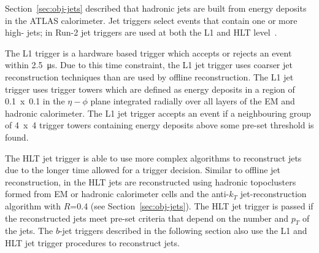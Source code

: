 Section~\ref{sec:obj-jets} described that hadronic jets are built from energy deposits in the ATLAS calorimeter.
Jet triggers select events that contain one or more high-\pT{} jets;
in Run-2 jet triggers are used at both the L1 and HLT level~\cite{trig-L1calo,trig-bTrig_desc}.


The L1 trigger is a hardware based trigger which accepts or rejects an event within \SI{2.5}{\micro\second}.
Due to this time constraint, the L1 jet trigger uses coarser jet reconstruction techniques than are used by offline reconstruction.
The L1 jet trigger uses trigger towers which are defined as energy deposits in a region of 0.1~x~0.1 in the $\eta-\phi$ plane integrated radially over all layers of the EM and hadronic calorimeter.
The L1 jet trigger accepts an event if a neighbouring group of 4~x~4 trigger towers containing energy deposits above some pre-set threshold is found.



The HLT jet trigger is able to use more complex algorithms to reconstruct jets due to the longer time allowed for a trigger decision.
Similar to offline jet reconstruction, in the HLT jets are reconstructed using 
hadronic topoclusters formed from EM or hadronic calorimeter cells and the anti-$k_T$ jet-reconstruction algorithm with $R$=0.4
(see Section~\ref{sec:obj-jets}).
The HLT jet trigger is passed if the reconstructed jets meet pre-set criteria that depend on the number and $p_T$ of the jets.
The $b$-jet triggers described in the following section also use the L1 and HLT jet trigger procedures to reconstruct jets.



